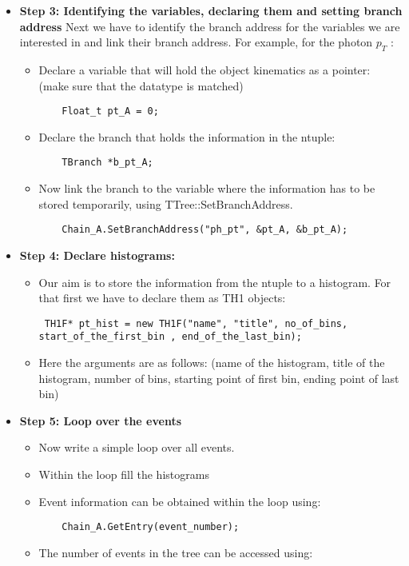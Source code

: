 \documentclass[letterpaper,12pt]{article}
\begin{document}
\begin{itemize}
\begin{itemize}
\begin{lstlisting}
\end{lstlisting}
\end{itemize}
\item {\bf Step 3: Identifying the variables, declaring them and setting branch address}
\vspace{3mm}
 Next we have to identify the branch address for the variables we are interested in and link their branch address. For example, for the photon $p_{T}$ : 
\begin{itemize}
\item Declare a variable that will hold the object kinematics as a pointer: (make sure that the datatype is matched)
\begin{lstlisting}
	Float_t pt_A = 0;
\end{lstlisting}
\item Declare the branch that holds the information in the ntuple:
\begin{lstlisting}
	TBranch *b_pt_A;
\end{lstlisting}

\item Now link the branch to the variable where the information has to be stored temporarily, using TTree::SetBranchAddress. %
\begin{lstlisting}
	Chain_A.SetBranchAddress("ph_pt", &pt_A, &b_pt_A);
\end{lstlisting}
\end{itemize}
\item {\bf Step 4: Declare histograms:}
\begin{itemize}
\item Our aim is to store the information from the ntuple to a histogram. For that first we have to declare them as TH1 objects:
 \begin{lstlisting}
 TH1F* pt_hist = new TH1F("name", "title", no_of_bins, start_of_the_first_bin , end_of_the_last_bin);
\end{lstlisting}
\item Here the arguments are as follows: (name of the histogram, title of the histogram, number of bins, starting point of first bin, ending point of last bin)
	\end{itemize}
\item {\bf Step 5: Loop over the events}
\begin{itemize}

\item Now write a simple loop over all events.
\item Within the loop fill the histograms
\item Event information can be obtained within the loop using:
\begin{lstlisting}
	Chain_A.GetEntry(event_number);
\end{lstlisting}
\item The number of events in the tree can be accessed using:


\end{itemize}
\end{itemize}
\end{document}
